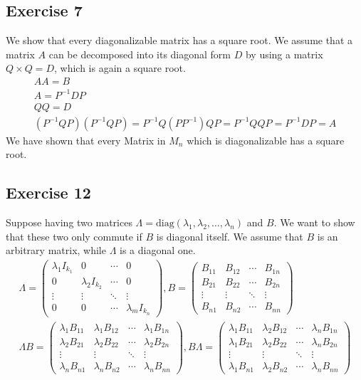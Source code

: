 \subsection{Exercise 7}
We show that every diagonalizable matrix has a square root. We assume that a matrix $A$ can be decomposed into its diagonal form $D$ by using a matrix $Q \times Q =D$, which is again a square root.
\begin{gather*}
A A = B \\
A = P^{-1} D P \\
Q Q = D\\
(P^{-1} Q P)(P^{-1} Q P) = P^{-1} Q (PP^{-1}) Q P = P^{-1} QQ P = P^{-1} D P = A
\end{gather*}
We have shown that every Matrix in $M_n$ which is diagonalizable has a square root.
\subsection{Exercise 12}
Suppose having two matrices $\Lambda = \text{diag} (\lambda_1 , \lambda_2 , \ldots ,\lambda_n)$ and $B$. We want to show that these two only commute if $B$ is diagonal itself. 
We assume that $B$ is an arbitrary matrix, while $\Lambda$ is a diagonal one.
\begin{gather*}
\Lambda = \begin{pmatrix}
  \lambda_1 I_{k_1} & 0 & \cdots & 0 \\
  0 & \lambda_2 I_{k_2} & \cdots & 0 \\
  \vdots  & \vdots  & \ddots & \vdots  \\
  0 & 0 & \cdots & \lambda_m I_{k_n}
 \end{pmatrix}
 ,B=
 \begin{pmatrix}
  B_{11} & B_{12} & \cdots & B_{1n} \\
  B_{21} & B_{22} & \cdots & B_{2n} \\
  \vdots  & \vdots  & \ddots & \vdots  \\
  B_{n1} & B_{n2} & \cdots & B_{nn}
 \end{pmatrix} \\
\Lambda B=
 \begin{pmatrix}
 \lambda_1 B_{11} & \lambda_1 B_{12} & \cdots & \lambda_1 B_{1n} \\
  \lambda_2 B_{21} & \lambda_2 B_{22} & \cdots & \lambda_2 B_{2n} \\
  \vdots  & \vdots  & \ddots & \vdots  \\
  \lambda_n B_{n1} & \lambda_n B_{n2} & \cdots & \lambda_n B_{nn}
 \end{pmatrix},
 B \Lambda=
 \begin{pmatrix}
 \lambda_1 B_{11} & \lambda_2 B_{12} & \cdots & \lambda_n B_{1n} \\
  \lambda_1 B_{21} & \lambda_2 B_{22} & \cdots & \lambda_n B_{2n} \\
  \vdots  & \vdots  & \ddots & \vdots  \\
  \lambda_1 B_{n1} & \lambda_2 B_{n2} & \cdots & \lambda_n B_{nn}
 \end{pmatrix}
 \end{gather*}
